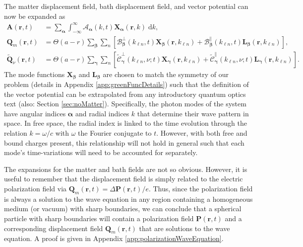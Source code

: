 \documentclass{article}
\begin{document}
The matter displacement field, bath displacement field, and vector potential can now be expanded as
\begin{equation}\label{eq:fieldExpansions}
\begin{split}
\mathbf{A}(\mathbf{r},t) &= \sum_{\bm{\alpha}}\int_{-\infty}^\infty \mathcal{A}_{\bm{\alpha}}(k,t)\mathbf{X}_{\bm{\alpha}}(\mathbf{r},k)\;\mathrm{d}k,\\
\mathbf{Q}_m(\mathbf{r},t) &= \Theta(a - r)\sum_{\bm{\beta}}\sum_n\left[\mathcal{B}_{\bm{\beta}}^\perp(k_{\ell n},t)\mathbf{X}_{\bm{\beta}}(\mathbf{r},k_{\ell n}) + \mathcal{B}_{\bm{\beta}}^\parallel(k_{\ell n},t)\mathbf{L}_{\bm{\beta}}(\mathbf{r},k_{\ell n})\right],\\
\tilde{\mathbf{Q}}_\nu(\mathbf{r},t) &= \Theta(a - r)\sum_{\bm{\gamma}}\sum_n\left[\tilde{\mathcal{C}}_{\bm{\gamma}}^\perp(k_{\ell n},\nu;t)\mathbf{X}_{\bm{\gamma}}(\mathbf{r},k_{\ell n}) + \tilde{\mathcal{C}}_{\bm{\gamma}}^\parallel(k_{\ell n},\nu;t)\mathbf{L}_{\bm{\gamma}}(\mathbf{r},k_{\ell n})\right].
\end{split}
\end{equation}
The mode functions $\mathbf{X}_{\bm{\beta}}$ and $\mathbf{L}_{\bm{\beta}}$ are chosen to match the symmetry of our problem (details in Appendix \ref{app:greenFuncDetails}) such that the definition of the vector potential can be extrapolated from any introductory quantum optics text (also: Section \ref{sec:noMatter}). Specifically, the photon modes of the system have angular indices $\bm{\alpha}$ and radial indices $k$ that determine their wave pattern in space. In free space, the radial index is linked to the time evolution through the relation $k = \omega/c$ with $\omega$ the Fourier conjugate to $t$. However, with both free and bound charges present, this relationship will not hold in general such that each mode's time-variations will need to be accounted for separately.

The expansions for the matter and bath fields are not so obvious. However, it is useful to remember that the displacement field is simply related to the electric polarization field via $\mathbf{Q}_m(\mathbf{r},t) = \Delta\mathbf{P}(\mathbf{r},t)/e$. Thus, since the polarization field is always a solution to the wave equation in any region containing a homogeneous medium (or vacuum) with sharp boundaries, we can conclude that a spherical particle with sharp boundaries will contain a polarization field $\mathbf{P}(\mathbf{r},t)$ and a corresponding displacement field $\mathbf{Q}_m(\mathbf{r},t)$ that are solutions to the wave equation. A proof is given in Appendix \ref{app:polarizationWaveEquation}.
\end{document}
